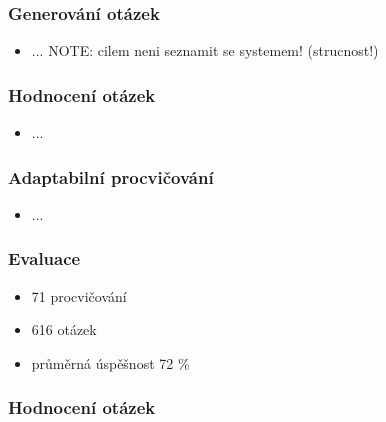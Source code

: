 \documentclass[xcolor=svgnames]{beamer}
\begin{document}
\begin{frame}
\frametitle{Generování otázek}
\begin{itemize}
\item ... NOTE: cilem neni seznamit se systemem! (strucnost!)
\end{itemize}
\end{frame}
\begin{frame}
\frametitle{Hodnocení otázek}
\begin{itemize}
\item ...
\end{itemize}
\end{frame}
\begin{frame}
\frametitle{Adaptabilní procvičování}
\begin{itemize}
\item ...
\end{itemize}
\end{frame}
\begin{frame}
\frametitle{Evaluace}
\begin{itemize}
\item 71 procvičování
\item 616 otázek
\item průměrná úspěšnost 72 \%
\end{itemize}
\end{frame}
\begin{frame}
\frametitle{Hodnocení otázek}
\begin{center}


\end{center}
\end{frame}
\end{document}
